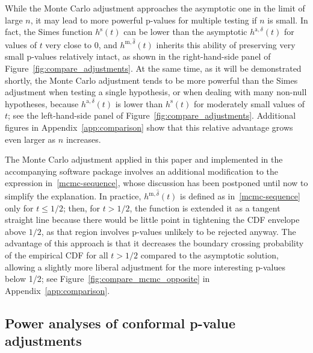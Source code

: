 While the Monte Carlo adjustment approaches the asymptotic one in the limit of large $n$, it may lead to more powerful p-values for multiple testing if $n$ is small. In fact, the Simes function $h^{\mathrm{s}}(t)$ can be lower than the asymptotic $h^{\mathrm{a},\delta}(t)$ for values of $t$ very close to 0, and $h^{\mathrm{m},\hat{\delta}}(t)$ inherits this ability of preserving very small p-values relatively intact, as shown in the right-hand-side panel of Figure~\ref{fig:compare_adjustments}.
At the same time, as it will be demonstrated shortly, the Monte Carlo adjustment tends to be more powerful than the Simes adjustment when testing a single hypothesis, or when dealing with many non-null hypotheses, because $h^{\mathrm{a},\delta}(t)$ is lower than $h^{\mathrm{s}}(t)$ for moderately small values of $t$; see the left-hand-side panel of Figure~\ref{fig:compare_adjustments}. Additional figures in Appendix~\ref{app:comparison} show that this relative advantage grows even larger as $n$ increases.

The Monte Carlo adjustment applied in this paper and implemented in the accompanying software package involves an additional modification to the expression in~\eqref{mcmc-sequence}, whose discussion has been postponed until now to simplify the explanation. In practice, $h^{\mathrm{m},\hat{\delta}}(t)$ is defined as in~\eqref{mcmc-sequence} only for $t \leq 1/2$; then, for $t>1/2$, the function is extended it as a tangent straight line because there would be little point in tightening the CDF envelope above $1/2$, as that region involves p-values unlikely to be rejected anyway. The advantage of this approach is that it decreases the boundary crossing probability of the empirical CDF for all $t>1/2$ compared to the asymptotic solution, allowing a slightly more liberal adjustment for the more interesting p-values below 1/2; see Figure~\ref{fig:compare_mcmc_opposite} in Appendix~\ref{app:comparison}.


\subsection{Power analyses of conformal p-value adjustments} \label{sec:gen-power}

